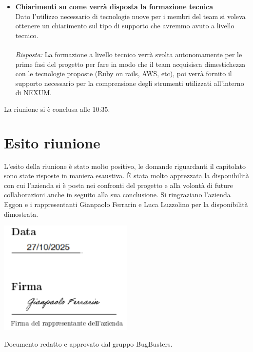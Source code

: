 \documentclass[a4paper,12pt]{article}
\begin{document}
\begin{itemize}
    \item \textbf{Chiarimenti su come verrà disposta la formazione tecnica}\\
    \noindent
    Dato l'utilizzo necessario di tecnologie nuove per i membri del team si voleva ottenere un chiarimento sul tipo di supporto che avremmo avuto a livello tecnico. \\ \\
    \textit{Risposta:} 
    La formazione a livello tecnico verrà svolta autonomamente per le prime fasi del progetto per fare in modo che il team acquisisca dimestichezza con le tecnologie proposte (Ruby on rails, AWS, etc), poi verrà fornito il supporto necessario per la comprensione degli strumenti utilizzati all'interno di NEXUM. 
    \vspace{1em}

\end{itemize}

La riunione si è conclusa alle 10:35.


\section{Esito riunione}
    L'esito della riunione è stato molto positivo, le domande riguardanti il capitolato sono state risposte in maniera esaustiva. È stata molto apprezzata la disponibilità con cui l'azienda si è posta nei confronti del progetto e alla volontà di future collaborazioni anche in seguito alla sua conclusione. Si ringraziano l'azienda Eggon e i rappresentanti Gianpaolo Ferrarin e Luca Luzzolino per la disponibilità dimostrata.
    
\vspace{1.0cm}
\noindent
\includegraphics[width=0.5\textwidth]{Data e firma.png}

\vfill
\begin{center}
    {\small\color{darkgray} Documento redatto e approvato dal gruppo BugBusters.}
\end{center}
\end{document}

